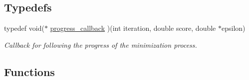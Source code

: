 \subsection*{Typedefs}
\begin{DoxyCompactItemize}
\item 
typedef void($\ast$ \hyperlink{group__soft__constraints_gafd57325a0fa4307cd72f933107f9d493}{progress\+\_\+callback} )(int iteration, double score, double $\ast$epsilon)
\begin{DoxyCompactList}\small\item\em Callback for following the progress of the minimization process. \end{DoxyCompactList}\end{DoxyCompactItemize}
\subsection*{Functions}
